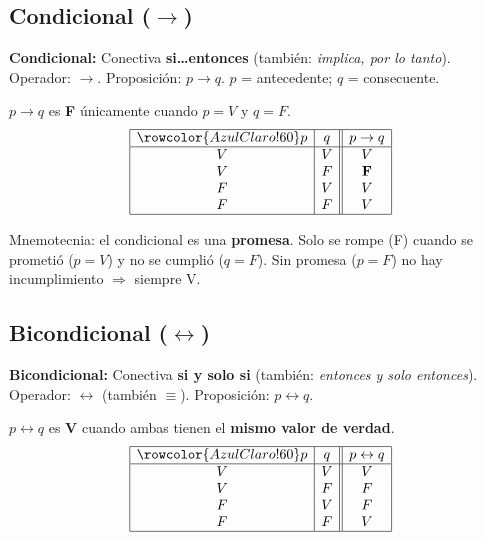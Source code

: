 	\subsection{Condicional ($\to$)}
	
	\begin{cajadef}
		\textbf{Condicional:} Conectiva \textbf{si\ldots entonces} (también:
		\textit{implica, por lo tanto}). Operador: $\to$. Proposición: $p \to q$.
		$p$ = antecedente; $q$ = consecuente.
	\end{cajadef}
	
	\begin{cajaprop}[Condicional]
		$p \to q$ es \textbf{F} únicamente cuando $p = V$ y $q = F$.
		\[
		\begin{array}{|c|c||c|}
			\hline
			\rowcolor{AzulClaro!60}
			p & q & p \to q \\
			\hline
			V & V & V \\
			V & F & \mathbf{F} \\
			F & V & V \\
			F & F & V \\
			\hline
		\end{array}
		\]
	\end{cajaprop}
	
	\begin{cajatip}
		Mnemotecnia: el condicional es una \textbf{promesa}. Solo se rompe (F) cuando
		se prometió ($p=V$) y no se cumplió ($q=F$). Sin promesa ($p=F$) no hay
		incumplimiento $\Rightarrow$ siempre V.
	\end{cajatip}
	
	\subsection{Bicondicional ($\leftrightarrow$)}
	
	\begin{cajadef}
		\textbf{Bicondicional:} Conectiva \textbf{si y solo si} (también:
		\textit{entonces y solo entonces}). Operador: $\leftrightarrow$ (también $\equiv$).
		Proposición: $p \leftrightarrow q$.
	\end{cajadef}
	
	\begin{cajaprop}[Bicondicional]
		$p \leftrightarrow q$ es \textbf{V} cuando ambas tienen el
		\textbf{mismo valor de verdad}.
		\[
		\begin{array}{|c|c||c|}
			\hline
			\rowcolor{AzulClaro!60}
			p & q & p \leftrightarrow q \\
			\hline
			V & V & V \\
			V & F & F \\
			F & V & F \\
			F & F & V \\
			\hline
		\end{array}
		\]
	\end{cajaprop}
	
